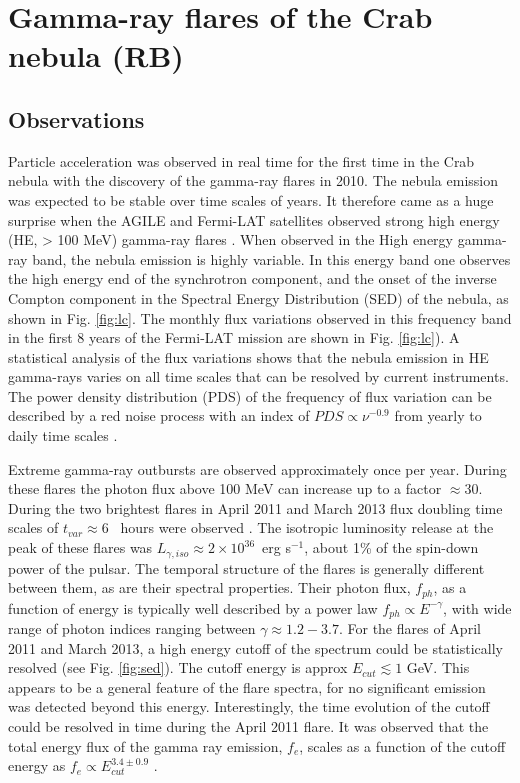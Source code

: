 \section{Gamma-ray flares of the Crab nebula (RB)}
\label{sec:flares}

\subsection{Observations}

Particle acceleration was observed in real time for the first time in the Crab nebula with the discovery of the gamma-ray flares in 2010.  The nebula emission was expected to  be stable over time scales of years. It therefore came as a huge surprise when the AGILE and Fermi-LAT satellites observed strong high energy (HE, > 100 MeV) gamma-ray flares \citep{Tavani2011,Abdo2011}. When observed in the High energy  gamma-ray band, the nebula emission is highly variable. In this energy band one observes the high energy end of the synchrotron component, and the onset of the inverse Compton component in the Spectral Energy Distribution (SED) of the nebula, as shown in Fig. \ref{fig:lc}. The monthly flux variations observed in this frequency band in the first 8 years of the Fermi-LAT mission are shown in Fig. \ref{fig:lc}). A statistical analysis of the flux variations shows that the nebula emission in HE gamma-rays varies on all time scales that can be resolved by current instruments. The power density distribution (PDS) of the frequency of flux variation can be described by a red noise process with an index of $PDS \propto \nu^{-0.9}$  from yearly to daily time scales \citep{buehler2012}.

Extreme gamma-ray outbursts are observed approximately once per year. During these flares the photon flux above 100 MeV can increase up to a factor $\approx 30$. During the two brightest flares in April 2011 and March 2013 flux doubling time scales of $t_{var}\approx 6$~ hours were observed \citep{buehler2012,Mayer2013}. The isotropic luminosity release at the peak of these flares was $L_{\gamma, iso} \approx 2 \times 10^{36}$~erg s$^{-1}$, about 1\% of the spin-down power of the pulsar. The temporal structure of the flares is generally different between them, as are their spectral properties. Their photon flux, $f_{ph}$,  as a function of energy is typically well described by a power law $f_{ph} \propto E^{-\gamma}$, with  wide range of photon indices ranging between  $\gamma \approx 1.2 - 3.7$. For the flares of April 2011 and March 2013, a high energy cutoff of the spectrum could be statistically resolved (see Fig. \ref{fig:sed}). The cutoff energy is approx $E_{cut} \lesssim 1$ GeV. This appears to be a general feature of the flare spectra, for no significant emission was detected beyond this energy. Interestingly, the time evolution of the cutoff could be resolved in time during the April 2011 flare. It was observed that the total energy flux of the gamma ray emission, $f_e$,  scales as a function of the cutoff energy as $f_e \propto E_{cut}^{3.4 \pm 0.9}$  \citep{buehler2012}.


